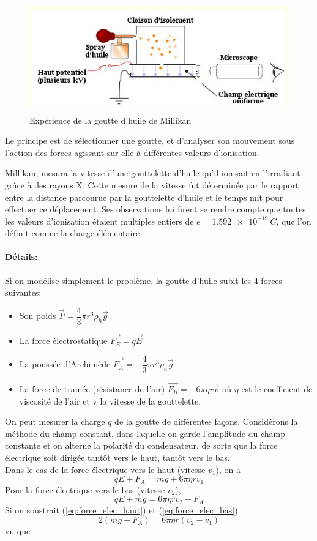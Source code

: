 \begin{figure}[ht]
\centering
\includegraphics[scale=0.60]{Images1/millikan.PNG}
\caption{Expérience de la goutte d'huile de Millikan}
\end{figure}

Le principe est de sélectionner une goutte, et  d'analyser son mouvement sous l'action des forces agissant sur elle  à différentes valeurs d'ionisation.

Millikan, mesura la vitesse d'une gouttelette d'huile qu'il ionisait en l'irradiant grâce à des rayons X. Cette mesure de la vitesse fut déterminée par le rapport entre la distance parcourue par la gouttelette d'huile et le temps mit pour effectuer ce déplacement. Ses observations lui firent se rendre compte que toutes les valeurs d'ionisation étaient multiples entiers de $e=\SI{1.592e-19}{C}$, que l'on définit comme la charge élémentaire.

\paragraph{Détails:} Si on modélise simplement le problème, la goutte d'huile subit les 4 forces suivantes:
\begin{itemize}
    \item Son poids $\Vec{P}=\dfrac{4}{3}\pi r^3 \rho_h\Vec{g}$
    \item La force électrostatique $\Vec{F_E}=q\Vec{E}$
    \item La poussée d'Archimède $\Vec{F_A}=-\dfrac{4}{3}\pi r^3 \rho_a \Vec{g}$
    \item La force de trainée (résistance de l'air) $\Vec{F_R}=-6\pi\eta r\Vec{v}$ où $\eta$ est le coefficient de viscosité de l'air et v la vitesse de la gouttelette.
\end{itemize}
On peut mesurer la charge $q$ de la goutte de différentes façons. Considérons la méthode du champ constant, dans laquelle on garde l'amplitude du champ constante et on alterne la polarité du condensateur, de sorte que la force électrique soit dirigée tantôt vers le haut, tantôt vers le bas. \\[0,2cm]
Dans le cas de la force électrique vers le haut (vitesse $v_1$), on a
\begin{equation}
    qE+F_A = mg+6\pi\eta rv_1
    \label{eq:force_elec_haut}
\end{equation}
    Pour la force électrique vers le bas (vitesse $v_2$),
\begin{equation}
    qE+mg = 6\pi\eta rv_2 + F_A
    \label{eq:force_elec_bas}
\end{equation}
Si on soustrait (\ref{eq:force_elec_haut}) et (\ref{eq:force_elec_bas})
\[
    2(mg-F_A)=6\pi\eta r(v_2-v_1)
\]
vu que

